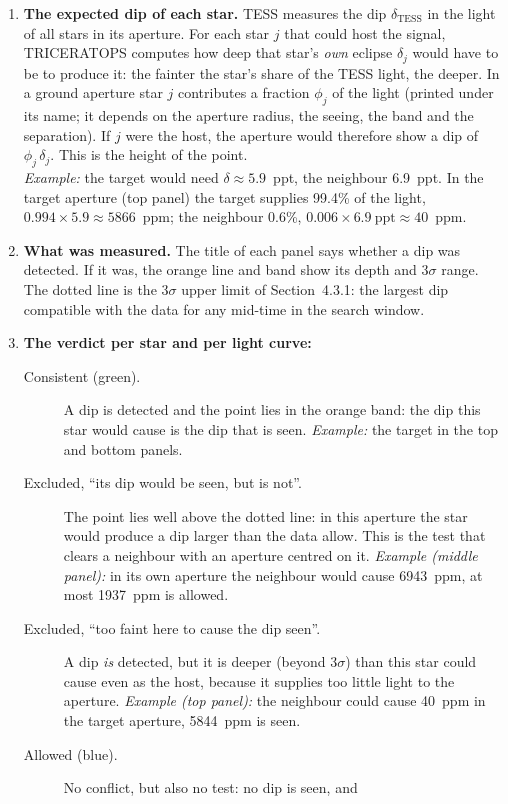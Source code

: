 \documentclass[11pt,a4paper]{report}
\begin{document}
\begin{enumerate}
\item \textbf{The expected dip of each star.} TESS measures the dip $\delta_\mathrm{TESS}$
in the light of all stars in its aperture. For each star $j$ that could host
the signal, TRICERATOPS computes how deep that star's \emph{own} eclipse
$\delta_j$ would have to be to produce it: the fainter the star's share of
the TESS light, the deeper. In a ground aperture star $j$ contributes a
fraction $\phi_j$ of the light (printed under its name; it depends on the
aperture radius, the seeing, the band and the separation). If $j$ were the
host, the aperture would therefore show a dip of $\phi_j\,\delta_j$. This is
the height of the point.\\
\emph{Example:} the target would need $\delta \approx 5.9$~ppt, the
neighbour 6.9~ppt. In the target aperture (top panel) the target supplies
99.4\% of the light, $0.994 \times 5.9 \approx 5866$~ppm; the neighbour
0.6\%, $0.006 \times 6.9~\text{ppt} \approx 40$~ppm.
\item \textbf{What was measured.} The title of each panel says whether a dip
was detected. If it was, the orange line and band show its depth and
3$\sigma$ range. The dotted line is the 3$\sigma$ upper limit of
Section~4.3.1: the largest dip compatible with the data for any mid-time in
the search window.
\item \textbf{The verdict per star and per light curve:}
\begin{description}
\item[Consistent (green).] A dip is detected and the point lies in the
orange band: the dip this star would cause is the dip that is seen.
\emph{Example:} the target in the top and bottom panels.
\item[Excluded, ``its dip would be seen, but is not''.] The point lies
well above the dotted line: in this aperture the star would produce a dip
larger than the data allow. This is the test that clears a neighbour with
an aperture centred on it.
\emph{Example (middle panel):} in its own aperture the neighbour would cause
6943~ppm, at most 1937~ppm is allowed.
\item[Excluded, ``too faint here to cause the dip seen''.] A dip \emph{is}
detected, but it is deeper (beyond 3$\sigma$) than this star could cause
even as the host, because it supplies too little light to the aperture.
\emph{Example (top panel):} the neighbour could cause 40~ppm in the target
aperture, 5844~ppm is seen.
\item[Allowed (blue).] No conflict, but also no test: no dip is seen, and

\end{description}
\end{enumerate}
\end{document}
